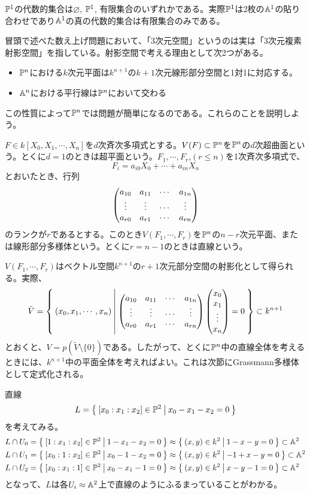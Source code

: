 \documentclass{ltjsreport}
\begin{document}
\begin{eg}
  $\mathbb{P}^1$の代数的集合は$\varnothing$, $\mathbb{P}^1$, 有限集合のいずれかである。実際$\mathbb{P}^1$は2枚の$\mathbb{A}^1$の貼り合わせであり$\mathbb{A}^1$の真の代数的集合は有限集合のみである。
\end{eg}


冒頭で述べた数え上げ問題において、「3次元空間」というのは実は「3次元複素射影空間」を指している。射影空間で考える理由として次2つがある。
\begin{itemize}
  \item $\mathbb{P}^n$における$k$次元平面は$k^{n+1}$の$k+1$次元線形部分空間と1対1に対応する。
  \item $\mathbb{A}^n$における平行線は$\mathbb{P}^n$において交わる
\end{itemize}
この性質によって$\mathbb{P}^n$では問題が簡単になるのである。これらのことを説明しよう。

\begin{defin}
  $F\in k[X_0,X_1,\cdots,X_n]$を$d$次斉次多項式とする。$V(F)\subset\mathbb{P}^n$を$\mathbb{P}^n$の$d$次超曲面という。とくに$d=1$のときは超平面という。$F_1,\cdots,F_r$,$(r\leq n)$を1次斉次多項式で、
  \[
  F_i=a_{i0}X_0+\cdots+a_{in}X_n
  \]
  とおいたとき、行列
  \[
  \begin{pmatrix} 
    a_{10} & a_{11} & \cdots & a_{1n}\\
    \vdots & \vdots & \cdots & \vdots \\
    a_{r0} & a_{r1} & \cdots & a_{rn}
   \end{pmatrix} 
  \]
  のランクが$r$であるとする。このとき$V(F_1,\cdots,F_r)$を$\mathbb{P}^n$の$n-r$次元平面、または線形部分多様体という。とくに$r=n-1$のときは直線という。
\end{defin}

$V(F_1,\cdots,F_r)$はベクトル空間$k^{n+1}$の$r+1$次元部分空間の射影化として得られる。実際、
\[
\tilde{V}=\left\{\:(x_0,x_1,\cdots,x_n)\:\middle|\:\begin{pmatrix} 
    a_{10} & a_{11} & \cdots & a_{1n}\\
    \vdots & \vdots & \cdots & \vdots \\
    a_{r0} & a_{r1} & \cdots & a_{rn}
 \end{pmatrix}\begin{pmatrix} x_0\\x_1\\\vdots\\x_n \end{pmatrix}=0\:\right\}\subset k^{n+1}
\]
とおくと、$V=p(\tilde{V}\setminus\{0\})$である。したがって、とくに$\mathbb{P}^n$中の直線全体を考えるときには、$k^{n+1}$中の平面全体を考えればよい。これは次節にGrassmann多様体として定式化される。

\begin{eg}
  直線
  \[
  L=\left\{\:[x_0:x_1:x_2]\in\mathbb{P}^2\:\middle|\:x_0-x_1-x_2=0\:\right\}  
  \]
  を考えてみる。
  \begin{align*}
  &L\cap U_0=\left\{\:[1:x_1:x_2]\in\mathbb{P}^2\:\middle|\:1-x_1-x_2=0\:\right\} \approx \left\{\:(x,y)\in k^2\:\middle|\:1-x-y=0\:\right\}\subset \mathbb{A}^2\\
  &L\cap U_1=\left\{\:[x_0:1:x_2]\in\mathbb{P}^2\:\middle|\:x_0-1-x_2=0\:\right\}
  \approx \left\{\:(x,y)\in k^2\:\middle|\:-1+x-y=0\:\right\}\subset \mathbb{A}^2\\
  &L\cap U_2=\left\{\:[x_0:x_1:1]\in\mathbb{P}^2\:\middle|\:x_0-x_1-1=0\:\right\}
  \approx \left\{\:(x,y)\in k^2\:\middle|\:x-y-1=0\:\right\}\subset \mathbb{A}^2
  \end{align*}
  となって、$L$は各$U_i\approx \mathbb{A}^2$上で直線のようにふるまっていることがわかる。
\end{eg}
\end{document}
